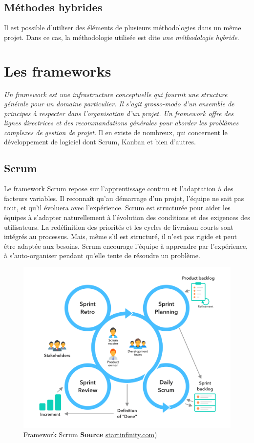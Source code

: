 			\subsection{M\'ethodes hybrides}
				Il est possible d'utiliser des \'el\'ements de plusieurs m\'ethodologies dans un m\^eme projet. Dans ce cas, la m\'ethodologie utilis\'ee est dite \textit{une m\'ethodologie hybride}.


	\section{Les frameworks}
		\textit{Un framework est une infrastructure conceptuelle qui fournit une structure g\'en\'erale pour un domaine particulier. Il s'agit grosso-modo d'un ensemble de principes \`a respecter dans l'organisation d'un projet. Un framework offre des lignes directrices et des recommandations g\'en\'erales pour aborder les probl\`ames complexes de gestion de projet.}\cite{Framework} Il en existe de nombreux, qui concernent le d\'eveloppement de logiciel dont Scrum, Kanban et bien d'autres.

		\subsection{Scrum\cite{Scrum}}
			Le framework Scrum repose sur l'apprentissage continu et l'adaptation \`a des facteurs variables. Il reconna\^it qu'au d\'emarrage d'un projet, l'\'equipe ne sait pas tout, et qu'il \'evoluera avec l'exp\'erience. Scrum est structur\'ee pour aider les \'equipes \`a s'adapter naturellement \`a l'\'evolution des conditions et des exigences des utilisateurs. La red\'efinition des priorit\'es et les cycles de livraison courts sont int\'egr\'es au processus. Mais, m\^eme s'il est structur\'e, il n'est pas rigide et peut \^etre adapt\'ee aux besoins. Scrum encourage l'\'equipe \`a apprendre par l'exp\'erience, \`a s'auto-organiser pendant qu'elle tente de r\'esoudre un probl\`eme.

\begin{figure}[ht]
	\centering
	\includegraphics[width=0.75\linewidth]{Pictures/Scrum.jpeg}
	\caption{Framework Scrum \textbf{Source} \href{https://startinfinity.com/project-management-methodologies/scrum}{startinfinity.com})}
	\label{scrum}
\end{figure}


